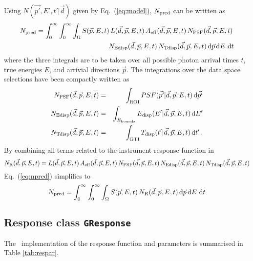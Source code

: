 \documentclass{article}[12pt,a4]
\begin{document}
Using $N(\vec{p'}, E', t' | \vec{d})$ given by Eq.~(\ref{eq:model}), $N_{\rm pred}$ can be
written as
\begin{eqnarray}
N_{\rm pred} = \int_{0}^{\infty} \int_{0}^{\infty} \int_{\Omega} 
  S(\vec{p}, E, t) \,
  L(\vec{d}, \vec{p}, E, t) \,
  A_{\rm eff}(\vec{d}, \vec{p}, E, t) \,
  N_{\rm PSF}(\vec{d}, \vec{p}, E, t) \, \nonumber \\
  N_{\rm Edisp}(\vec{d}, \vec{p}, E, t) \,
  N_{\rm Tdisp}(\vec{d}, \vec{p}, E, t) 
\, {\rm d}\vec{p} \, {\rm d}E \, \,{\rm d}t
\label{eq:npred}
\end{eqnarray}
where the three integrals are to be taken over all possible photon arrival times $t$, 
true energies $E$, and arrivial directions $\vec{p}$.
The integrations over the data space selections have been compactly written
as
\begin{eqnarray}
N_{\rm PSF}(\vec{d}, \vec{p}, E, t) & = & 
\int_{\rm ROI} PSF(\vec{p'} | \vec{d}, \vec{p}, E, t) \, {\rm d}\vec{p'} \\
N_{\rm Edisp}(\vec{d}, \vec{p}, E, t) & = & 
\int_{E_{\rm bounds}} E_{\rm disp}(E' | \vec{d}, \vec{p}, E, t) \, {\rm d}E' \\
N_{\rm Tdisp}(\vec{d}, \vec{p}, E, t) & = & 
\int_{\rm GTI} T_{\rm disp}(t' | \vec{d}, \vec{p}, E, t) \, {\rm d}t' \, .
\end{eqnarray}
By combining all terms related to the instrument response function in
\begin{equation}
N_{\rm R}(\vec{d}, \vec{p}, E, t) = 
  L(\vec{d}, \vec{p}, E, t) \,
  A_{\rm eff}(\vec{d}, \vec{p}, E, t) \,
  N_{\rm PSF}(\vec{d}, \vec{p}, E, t) \,
  N_{\rm Edisp}(\vec{d}, \vec{p}, E, t) \,
  N_{\rm Tdisp}(\vec{d}, \vec{p}, E, t)
\label{eq:nirf}
\end{equation}
Eq.~(\ref{eq:npred}) simplifies to
\begin{equation}
N_{\rm pred} = \int_{0}^{\infty} \int_{0}^{\infty} \int_{\Omega} 
  S(\vec{p}, E, t) \,
  N_{\rm R}(\vec{d}, \vec{p}, E, t)
\, {\rm d}\vec{p} \, {\rm d}E \, \,{\rm d}t
\end{equation}


\subsection{Response class {\tt GResponse}}
\label{sec:GResponse}

The \this\ implementation of the response function and parameters is summarised in 
Table \ref{tab:respar}.
\end{document}

